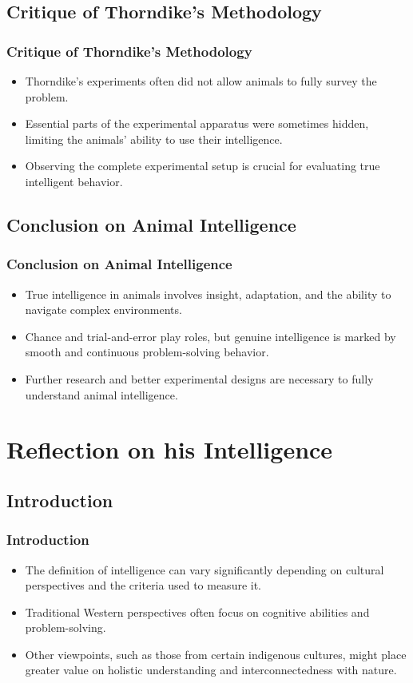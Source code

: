 \documentclass[10pt]{beamer}
\begin{document}
    \subsection{Critique of Thorndike's Methodology}
    \begin{frame}
    \frametitle{Critique of Thorndike's Methodology}
    \begin{itemize}
        \item Thorndike's experiments often did not allow animals to fully survey the problem.
        \item Essential parts of the experimental apparatus were sometimes hidden, limiting the animals' ability to use their intelligence.
        \item Observing the complete experimental setup is crucial for evaluating true intelligent behavior.
    \end{itemize}
    \end{frame}
    
    \subsection{Conclusion on Animal Intelligence}
    \begin{frame}
    \frametitle{Conclusion on Animal Intelligence}
    \begin{itemize}
        \item True intelligence in animals involves insight, adaptation, and the ability to navigate complex environments.
        \item Chance and trial-and-error play roles, but genuine intelligence is marked by smooth and continuous problem-solving behavior.
        \item Further research and better experimental designs are necessary to fully understand animal intelligence.
    \end{itemize}
    \end{frame}




\section{Reflection on his Intelligence} 

\subsection{Introduction}
\begin{frame}
    \frametitle{Introduction}
    \begin{itemize}
        \item The definition of intelligence can vary significantly depending on cultural perspectives and the criteria used to measure it.
        \item Traditional Western perspectives often focus on cognitive abilities and problem-solving.
        \item Other viewpoints, such as those from certain indigenous cultures, might place greater value on holistic understanding and interconnectedness with nature.
    \end{itemize}
\end{frame}
\end{document}
